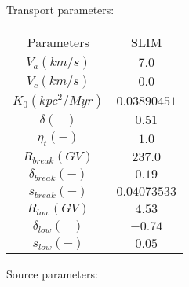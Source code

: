 Transport parameters:

\begin{tabular}{c |c}
	Parameters & SLIM \\ 
	\cline{1-2}
	$V_{a} (km/s)$ & $7.0$ \\ 
	$V_c (km/s)$ & $0.0$ \\ 
	$K_0 (kpc^2/Myr)$ & $0.03890451$ \\ 
	$\delta (-)$ & $0.51$ \\ 
	$\eta_t (-)$ & $1.0$ \\ 
	$R_{break} (GV)$ & $237.0$ \\ 
	$\delta_{break} (-)$ & $0.19$ \\ 
	$s_{break} (-)$ & $0.04073533$ \\ 
	$R_{low} (GV)$ & $4.53$ \\ 
	$\delta_{low} (-)$ & $-0.74$ \\ 
	$s_{low} (-)$ & $0.05$ \\ 
\end{tabular}

Source parameters:

